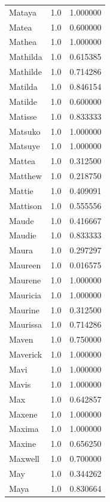 \documentclass[
  letterpaper,
  DIV=11,
  numbers=noendperiod]{scrreprt}
\begin{document}
\begin{tabular}{lrr}
Mataya          &   1.0 &   1.000000 \\
Matea           &   1.0 &   0.600000 \\
Mathea          &   1.0 &   1.000000 \\
Mathilda        &   1.0 &   0.615385 \\
Mathilde        &   1.0 &   0.714286 \\
Matilda         &   1.0 &   0.846154 \\
Matilde         &   1.0 &   0.600000 \\
Matisse         &   1.0 &   0.833333 \\
Matsuko         &   1.0 &   1.000000 \\
Matsuye         &   1.0 &   1.000000 \\
Mattea          &   1.0 &   0.312500 \\
Matthew         &   1.0 &   0.218750 \\
Mattie          &   1.0 &   0.409091 \\
Mattison        &   1.0 &   0.555556 \\
Maude           &   1.0 &   0.416667 \\
Maudie          &   1.0 &   0.833333 \\
Maura           &   1.0 &   0.297297 \\
Maureen         &   1.0 &   0.016575 \\
Maurene         &   1.0 &   1.000000 \\
Mauricia        &   1.0 &   1.000000 \\
Maurine         &   1.0 &   0.312500 \\
Maurissa        &   1.0 &   0.714286 \\
Maven           &   1.0 &   0.750000 \\
Maverick        &   1.0 &   1.000000 \\
Mavi            &   1.0 &   1.000000 \\
Mavis           &   1.0 &   1.000000 \\
Max             &   1.0 &   0.642857 \\
Maxene          &   1.0 &   1.000000 \\
Maxima          &   1.0 &   1.000000 \\
Maxine          &   1.0 &   0.656250 \\
Maxwell         &   1.0 &   0.700000 \\
May             &   1.0 &   0.344262 \\
Maya            &   1.0 &   0.830664 \\

\end{tabular}
\end{document}
